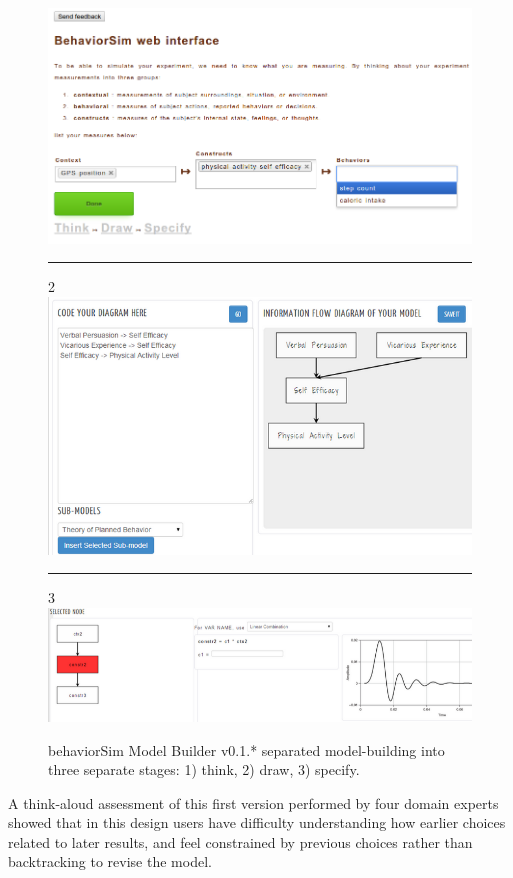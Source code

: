 \begin{figure}[!t]
  \includegraphics[width=0.9\columnwidth]{img/v1-think}
  \rule{\columnwidth}{0.4pt}
  2
  \includegraphics[width=0.9\columnwidth]{img/v1-draw}
  \rule{\columnwidth}{0.4pt}
  3
  \includegraphics[width=0.9\columnwidth]{img/v1-specify}  
  \caption{behaviorSim Model Builder v0.1.* separated model-building into three separate stages: 1) think, 2) draw, 3) specify.}
  \label{model-builder-v1}
\end{figure}

A think-aloud assessment of this first version performed by four domain experts showed that in this design users have difficulty understanding how earlier choices related to later results, and feel constrained by previous choices rather than backtracking to revise the model.

